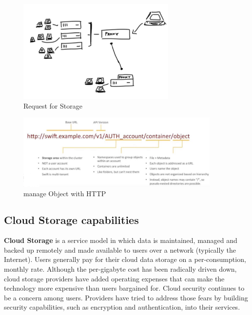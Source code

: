 \begin{figure}[H]
    \centering
    \includegraphics[width=0.7\textwidth]{assets/fig45.png}
    \caption{Request for Storage}
\end{figure}

\begin{figure}[H]
    \centering
    \includegraphics[width=0.9\textwidth]{assets/fig46.png}
    \caption{manage Object with HTTP}
\end{figure}

\subsection{Cloud Storage capabilities}

\begin{definitionblock}
    \textbf{Cloud Storage} is a service model in which data is maintained, managed and backed up remotely and made available to users over a network (typically the Internet). Users generally pay for their cloud data storage on a per-consumption, monthly rate. Although the per-gigabyte cost has been radically driven down, cloud storage providers have added operating expenses that can make the technology more expensive than users bargained for. Cloud security continues to be a concern among users. Providers have tried to address those fears by building security capabilities, such as encryption and authentication, into their services.
\end{definitionblock}

